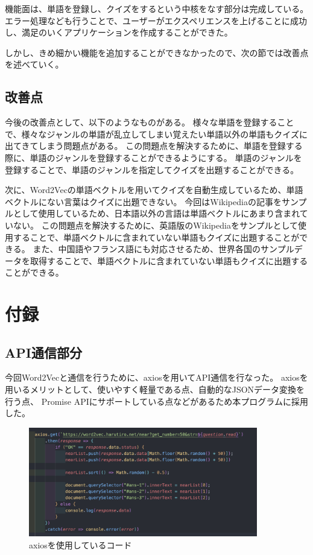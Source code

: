 \documentclass[11pt,a4paper]{jsarticle}
\begin{document}
機能面は、単語を登録し、クイズをするという中核をなす部分は完成している。
エラー処理なども行うことで、ユーザーがエクスペリエンスを上げることに成功し、満足のいくアプリケーションを作成することができた。

しかし、きめ細かい機能を追加することができなかったので、次の節では改善点を述べていく。


\subsection{改善点}
今後の改善点として、以下のようなものがある。
様々な単語を登録することで、様々なジャンルの単語が乱立してしまい覚えたい単語以外の単語もクイズに出てきてしまう問題点がある。
この問題点を解決するために、単語を登録する際に、単語のジャンルを登録することができるようにする。
単語のジャンルを登録することで、単語のジャンルを指定してクイズを出題することができる。

次に、Word2Vecの単語ベクトルを用いてクイズを自動生成しているため、単語ベクトルにない言葉はクイズに出題できない。
今回はWikipediaの記事をサンプルとして使用しているため、日本語以外の言語は単語ベクトルにあまり含まれていない。
この問題点を解決するために、英語版のWikipediaをサンプルとして使用することで、単語ベクトルに含まれていない単語もクイズに出題することができる。
また、中国語やフランス語にも対応させるため、世界各国のサンプルデータを取得することで、単語ベクトルに含まれていない単語もクイズに出題することができる。

\section{付録}

\subsection{API通信部分}

今回Word2Vecと通信を行うために、axiosを用いてAPI通信を行なった。
axiosを用いるメリットとして、使いやすく軽量である点、自動的なJSONデータ変換を行う点、
Promise APIにサポートしている点などがあるため本プログラムに採用した。


\begin{figure}[htbp]
    \begin{center}
        \includegraphics[width=100mm]{./img/axios.png}
    \end{center}
    \caption{axiosを使用しているコード}
\end{figure}
\end{document}

